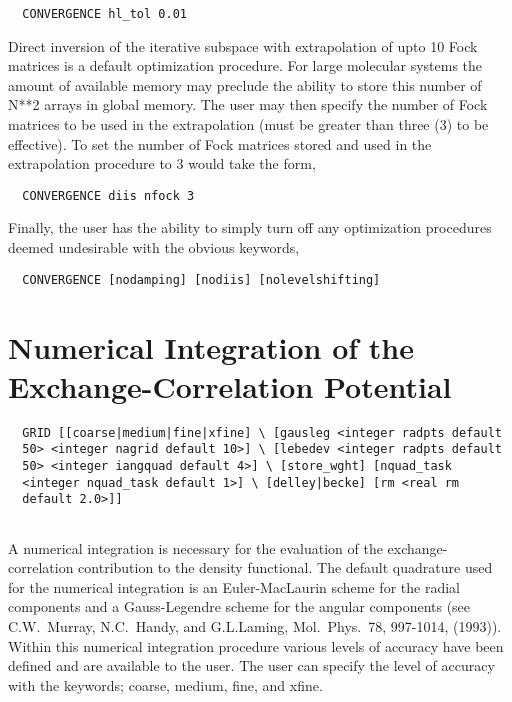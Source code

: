 \begin{verbatim}
  CONVERGENCE hl_tol 0.01
\end{verbatim}

Direct inversion of the iterative subspace with extrapolation of upto
10 Fock matrices is a default optimization procedure.  For large
molecular systems the amount of available memory may preclude the ability to
store this number of N**2 arrays in global memory.  The user may then
specify the number of Fock matrices to be used in the extrapolation
(must be greater than three (3) to be effective).  To set the number of
Fock matrices stored and used in the extrapolation procedure to 3
would take the form,

\begin{verbatim}
  CONVERGENCE diis nfock 3
\end{verbatim}

Finally, the user has the ability to simply turn off any optimization
procedures deemed undesirable with the obvious keywords,
\begin{verbatim}
  CONVERGENCE [nodamping] [nodiis] [nolevelshifting]
\end{verbatim}


\section{Numerical Integration of the Exchange-Correlation Potential}

\begin{verbatim}
  GRID [[coarse|medium|fine|xfine] \ [gausleg <integer radpts default
  50> <integer nagrid default 10>] \ [lebedev <integer radpts default
  50> <integer iangquad default 4>] \ [store_wght] [nquad_task
  <integer nquad_task default 1>] \ [delley|becke] [rm <real rm
  default 2.0>]]
        

\end{verbatim}

A numerical integration is necessary for the evaluation of the
exchange-correlation contribution to the density functional.  The
default quadrature used for the numerical integration is an
Euler-MacLaurin scheme for the radial components and a Gauss-Legendre
scheme for the angular components (see C.W.~Murray, N.C.~Handy, and
G.L.Laming, Mol.~Phys.~78, 997-1014, (1993)).  Within this numerical 
integration procedure various levels of accuracy have been defined and
are available to the user.  The user can specify the level of accuracy
with the keywords; coarse, medium, fine, and xfine.

